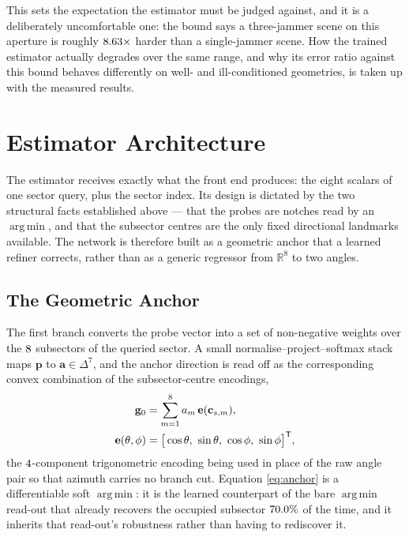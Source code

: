 \documentclass[journal]{IEEEtran}
\newcommand{\pv}{\mathbf{p}}
\newcommand{\Tr}{\mathsf{T}}
\DeclareMathOperator*{\argmin}{arg\,min}
\begin{document}
This sets the expectation the estimator must be judged against, and it is a
deliberately uncomfortable one: the bound says a
three-jammer scene on this aperture is roughly $8.63\times$ harder than a
single-jammer scene. How the trained estimator actually degrades over the same
range, and why its error ratio against this bound behaves differently on
well- and ill-conditioned geometries, is taken up with the measured results.

\section{Estimator Architecture}
\label{sec:arch}

The estimator receives exactly what the front end produces: the eight scalars
of one sector query, plus the sector index. Its design is dictated by the two
structural facts established above --- that the probes are notches read by an
$\argmin$, and that the subsector centres are the only fixed directional
landmarks available. The network is therefore built as a geometric anchor that
a learned refiner corrects, rather than as a generic regressor from
$\mathbb{R}^{8}$ to two angles.

\subsection{The Geometric Anchor}
\label{sec:arch:anchor}

The first branch converts the probe vector into a set of non-negative weights
over the $8$ subsectors of the queried sector. A small
normalise--project--softmax stack maps $\pv$ to $\mathbf{a} \in \Delta^{7}$,
and the anchor direction is read off as the corresponding convex combination
of the subsector-centre encodings,
\begin{equation}
\begin{split}
\mathbf{g}_0 &= \sum_{m=1}^{\numProbes} a_m\, \mathbf{e}(\mathbf{c}_{s,m}), \\
\mathbf{e}(\theta,\phi) &=
\big[\cos\theta,\ \sin\theta,\ \cos\phi,\ \sin\phi\big]^{\Tr},
\end{split}
\label{eq:anchor}
\end{equation}
the $4$-component trigonometric encoding being used in place of the
raw angle pair so that azimuth carries no branch cut. Equation
\eqref{eq:anchor} is a differentiable soft $\argmin$: it is the learned
counterpart of the bare $\argmin$ read-out that already recovers the occupied
subsector $70.0\%$ of the time, and it inherits that read-out's
robustness rather than having to rediscover it.
\end{document}
